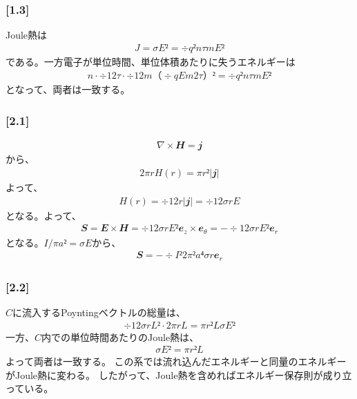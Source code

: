 \documentclass[\main/main.tex]{subfiles}
\begin{document}
\subsubsection*{
  [1.3]
}
Joule熱は
\begin{align}
  J = σE² = ÷{q²nτ}{m}E²
\end{align}
である。一方電子が単位時間、単位体積あたりに失うエネルギーは
\begin{align}
  n⋅÷{1}{2τ}⋅÷{1}{2}m（÷{qE}{m}2τ）²
  = ÷{q²nτ}{m}E²
\end{align}
となって、両者は一致する。

\subsubsection*{
  [2.1]
}
\begin{align}
  ∇×𝑯 = 𝒋
\end{align}
から、
\begin{align}
  2𝜋rH(r) = 𝜋r²|𝒋|
\end{align}
よって、
\begin{align}
  H(r) = ÷{1}{2}r|𝒋| = ÷{1}{2}σrE
\end{align}
となる。よって、
\begin{align}
  𝑺 = 𝑬×𝑯 = ÷{1}{2}σrE²𝒆_z×𝒆_θ
  = -÷{1}{2}σrE²𝒆_r
\end{align}
となる。$I/𝜋a² = σE$から、
\begin{align}
  𝑺 = -÷{I²}{2𝜋²a⁴σ}r𝒆_r
\end{align}
\subsubsection*{
  [2.2]
}
$C$に流入するPoyntingベクトルの総量は、
\begin{align}
  ÷{1}{2}σrL²⋅2𝜋rL = 𝜋r²LσE²
\end{align}
一方、$C$内での単位時間あたりのJoule熱は、
\begin{align}
  σE² = 𝜋r²L
\end{align}
よって両者は一致する。
この系では流れ込んだエネルギーと同量のエネルギーがJoule熱に変わる。
したがって、Joule熱を含めればエネルギー保存則が成り立っている。
\end{document}

